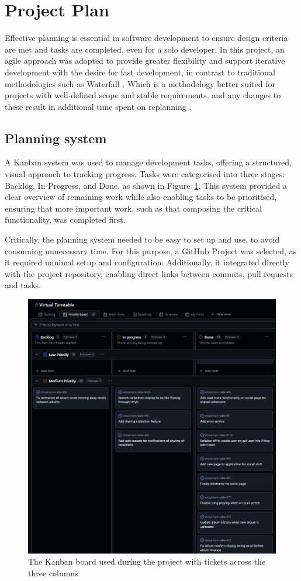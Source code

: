 \section{Project Plan}
Effective planning is essential in software development to ensure design criteria are met and tasks are completed, even for a solo developer. In this project, an agile approach was adopted to provide greater flexibility and support iterative development with the desire for fast development, in contrast to traditional methodologies such as Waterfall \cite{5222784}. Which is a methodology better suited for projects with well-defined scope and stable requirements, and any changes to these result in additional time spent on replanning \cite{andrei2019study}.

\subsection{Planning system} \label{sec:plan-system}
A Kanban system was used to manage development tasks, offering a structured, visual approach to tracking progress. Tasks were categorised into three stages: Backlog, In Progress, and Done, as shown in Figure~\ref{fig:kanban-board}. This system provided a clear overview of remaining work while also enabling tasks to be prioritised, ensuring that more important work, such as that composing the critical functionality, was completed first.

Critically, the planning system needed to be easy to set up and use, to avoid consuming unnecessary time. For this purpose, a GitHub Project was selected, as it required minimal setup and configuration. Additionally, it integrated directly with the project repository, enabling direct links between commits, pull requests and tasks.

\begin{figure}
    \centering
    \includegraphics[width=0.65\linewidth]{figures/kanban_board.png}
    \captionsetup{justification=centering,margin=2cm}
    \caption{The Kanban board used during the project with tickets across the three columns}
    \label{fig:kanban-board}
\end{figure}

